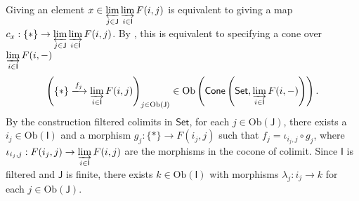 \begin{prf}
\begin{enumerate}[(i)]
        Giving an element $x\in \varprojlim\limits_{j\in\mathsf{J}} \varinjlim\limits_{i\in\mathsf{I}} F(i,j)$ is equivalent to giving a map $c_x: \{*\}\to \varprojlim\limits_{j\in\mathsf{J}} \varinjlim\limits_{i\in\mathsf{I}} F(i,j)$. By , this is equivalent to specifying a cone over $\varinjlim\limits_{i\in\mathsf{I}} F(i,-)$
        \[
        \left( \{*\}\xlongrightarrow{f_j}  \varinjlim\limits_{i\in\mathsf{I}} F(i,j)\right)_{j\in \mathrm{Ob}(\mathsf{J})}\in \mathrm{Ob}\left(\mathsf{Cone}\left(\mathsf{Set}, \varinjlim\limits_{i\in\mathsf{I}} F(i,-)\right)\right).
        \]
        By the construction filtered colimits in $\mathsf{Set}$, for each $j\in \mathrm{Ob}(\mathsf{J})$, there exists a $i_j\in \mathrm{Ob}(\mathsf{I})$ and a morphism $g_j:\{*\}\to F(i_j,j)$ such that $f_j=\iota_{i_j,j}\circ g_j$, where $\iota_{i_j,j}: F(i_j,j)\to \varinjlim\limits_{i\in\mathsf{I}}F(i,j)$ are the morphisms in the cocone of colimit. Since $\mathsf{I}$ is filtered and $\mathsf{J}$ is finite, there exists $k\in \mathrm{Ob}(\mathsf{I})$ with morphisms $\lambda_j: i_j\to k$ for each $j\in \mathrm{Ob}(\mathsf{J})$. 



\end{enumerate}
\end{prf}
